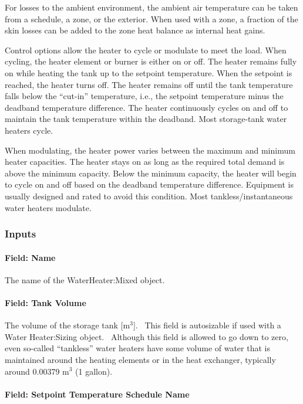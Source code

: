 For losses to the ambient environment, the ambient air temperature can be taken from a schedule, a zone, or the exterior. When used with a zone, a fraction of the skin losses can be added to the zone heat balance as internal heat gains.

Control options allow the heater to cycle or modulate to meet the load. When cycling, the heater element or burner is either on or off. The heater remains fully on while heating the tank up to the setpoint temperature. When the setpoint is reached, the heater turns off. The heater remains off until the tank temperature falls below the ``cut-in'' temperature, i.e., the setpoint temperature minus the deadband temperature difference. The heater continuously cycles on and off to maintain the tank temperature within the deadband. Most storage-tank water heaters cycle.

When modulating, the heater power varies between the maximum and minimum heater capacities. The heater stays on as long as the required total demand is above the minimum capacity. Below the minimum capacity, the heater will begin to cycle on and off based on the deadband temperature difference. Equipment is usually designed and rated to avoid this condition. Most tankless/instantaneous water heaters modulate.

\subsubsection{Inputs}\label{inputs-052}

\paragraph{Field: Name}\label{field-name-050}

The name of the WaterHeater:Mixed object.

\paragraph{Field: Tank Volume}\label{field-tank-volume-000}

The volume of the storage tank {[}m\(^{3}\){]}.~ This field is autosizable if used with a Water Heater:Sizing object.~ Although this field is allowed to go down to zero, even so-called ``tankless'' water heaters have some volume of water that is maintained around the heating elements or in the heat exchanger, typically around 0.00379 m\(^{3}\) (1 gallon).

\paragraph{Field: Setpoint Temperature Schedule Name}\label{field-setpoint-temperature-schedule-name-001}

